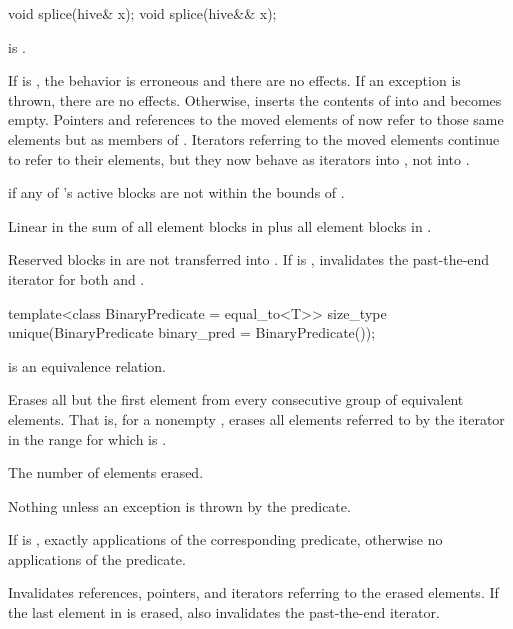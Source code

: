 %
\begin{itemdecl}
void splice(hive& x);
void splice(hive&& x);
\end{itemdecl}

\begin{itemdescr}
\pnum
\expects
{} is .

\pnum
\effects
If  is ,
the behavior is erroneous and there are no effects.
If an exception is thrown,
there are no effects.
Otherwise, inserts the contents of  into  and
 becomes empty.
Pointers and references to the moved elements of 
now refer to those same elements but as members of .
Iterators referring to the moved elements continue to refer to their elements,
but they now behave as iterators into , not into .

\pnum
\throws
{} if any of 's active blocks
are not within the bounds of .

\pnum
\complexity
Linear in the sum of
all element blocks in  plus all element blocks in .

\pnum
\remarks
Reserved blocks in  are not transferred into .
If  is ,
invalidates the past-the-end iterator for both  and .
\end{itemdescr}

%
\begin{itemdecl}
template<class BinaryPredicate = equal_to<T>>
  size_type unique(BinaryPredicate binary_pred = BinaryPredicate());
\end{itemdecl}

\begin{itemdescr}
\pnum
\expects
{} is an equivalence relation.

\pnum
\effects
Erases all but the first element
from every consecutive group of equivalent elements.
That is, for a nonempty ,
erases all elements referred to by the iterator 
in the range 
for which  is .

\pnum
\returns
The number of elements erased.

\pnum
\throws
Nothing unless an exception is thrown by the predicate.

\pnum
\complexity
If  is ,
exactly  applications of the corresponding predicate,
otherwise no applications of the predicate.

\pnum
\remarks
Invalidates references, pointers, and iterators
referring to the erased elements.
If the last element in  is erased,
also invalidates the past-the-end iterator.
\end{itemdescr}

